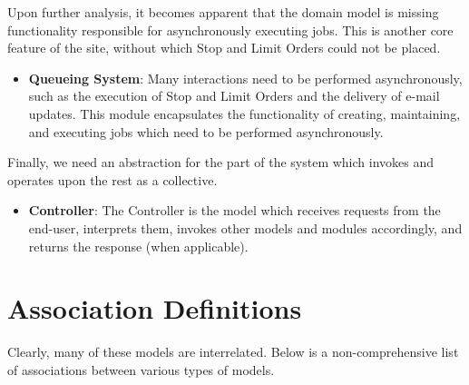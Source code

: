 Upon further analysis, it becomes apparent that the domain model is missing
functionality responsible for asynchronously executing jobs. This is another
core feature of the site, without which Stop and Limit Orders could not 
be placed.

\begin{itemize}
\item \textbf{Queueing System}: Many interactions need to be performed asynchronously,
such as the execution of Stop and Limit Orders and the delivery of e-mail 
updates. This module encapsulates the functionality of creating, maintaining,
and executing jobs which need to be performed asynchronously.
\end{itemize}

Finally, we need an abstraction for the part of the system which invokes and operates
upon the rest as a collective.

\begin{itemize}
\item \textbf{Controller}: The Controller is the model which receives requests from 
the end-user, interprets them, invokes other models and modules accordingly, and 
returns the response (when applicable).
\end{itemize}


\section{Association Definitions}

Clearly, many of these models are interrelated. Below is a non-comprehensive
list of associations between various types of models.

